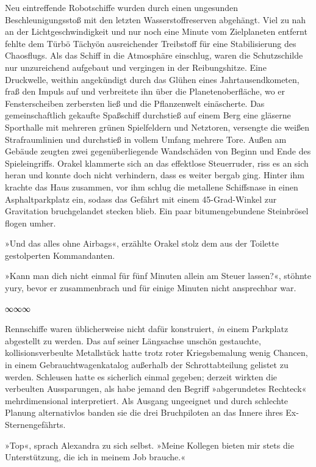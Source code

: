 Neu eintreffende Robotschiffe wurden durch einen ungesunden Beschleunigungsstoß mit den letzten Wasserstoffreserven abgehängt. Viel zu nah an der Lichtgeschwindigkeit und nur noch eine Minute vom Zielplaneten entfernt fehlte dem Türbö Tächyön ausreichender Treibstoff für eine Stabilisierung des Chaosflugs. Als das Schiff in die Atmosphäre einschlug, waren die Schutzschilde nur unzureichend aufgebaut und vergingen in der Reibungshitze. Eine Druckwelle, weithin angekündigt durch das Glühen eines Jahrtausendkometen, fraß den Impuls auf und verbreitete ihn über die Planetenoberfläche, wo er Fensterscheiben zerbersten ließ und die Pflanzenwelt einäscherte. Das gemeinschaftlich gekaufte Spaßschiff durchstieß auf einem Berg eine gläserne Sporthalle mit mehreren grünen Spielfeldern und Netztoren, versengte die weißen Strafraumlinien und durchstieß in vollem Umfang mehrere Tore. Außen am Gebäude zeugten zwei gegenüberliegende Wandschäden von Beginn und Ende des Spieleingriffs. Orakel klammerte sich an das effektlose Steuerruder, riss es an sich heran und konnte doch nicht verhindern, dass es weiter bergab ging. Hinter ihm krachte das Haus zusammen, vor ihm schlug die metallene Schiffsnase in einen Asphaltparkplatz ein, sodass das Gefährt mit einem 45-Grad-Winkel zur Gravitation bruchgelandet stecken blieb. Ein paar bitumengebundene Steinbrösel flogen umher.

»Und das alles ohne Airbags«, erzählte Orakel stolz dem aus der Toilette gestolperten Kommandanten.

»Kann man dich nicht einmal für fünf Minuten allein am Steuer lassen?«, stöhnte yury, bevor er zusammenbrach und für einige Minuten nicht ansprechbar war.

\begin{center}
∞∞∞
\end{center}

Rennschiffe waren üblicherweise nicht dafür konstruiert, \emph{in} einem Parkplatz abgestellt zu werden. Das auf seiner Längsachse unschön gestauchte, kollisionsverbeulte Metallstück hatte trotz roter Kriegsbemalung wenig Chancen, in einem Gebrauchtwagenkatalog außerhalb der Schrottabteilung gelistet zu werden. Schleusen hatte es sicherlich einmal gegeben; derzeit wirkten die verbeulten Aussparungen, als habe jemand den Begriff »abgerundetes Rechteck« mehrdimensional interpretiert. Als Ausgang ungeeignet und durch schlechte Planung alternativlos banden sie die drei Bruchpiloten an das Innere ihres Ex-Sternengefährts.

»Top«, sprach Alexandra zu sich selbst. »Meine Kollegen bieten mir stets die Unterstützung, die ich in meinem Job brauche.«

